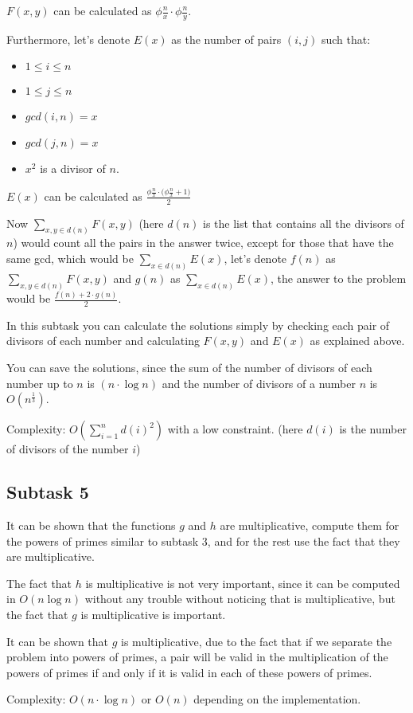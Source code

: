 \(F (x, y)\) can be calculated as
\(\phi {\frac {n} {x}} \cdot \phi {\frac {n} {y}}\).

Furthermore, let's denote \(E (x)\) as the number of pairs \((i, j)\)
such that:

\begin{itemize}
\tightlist
\item
  \(1 \leq i \leq n\)
\item
  \(1 \leq j \leq n\)
\item
  \(gcd (i, n) = x\)
\item
  \(gcd (j, n) = x\)
\item
  \(x ^ 2\) is a divisor of \(n\).
\end{itemize}

\(E (x)\) can be calculated as
\(\frac {\phi {\frac {n} {x}} \cdot (\phi {\frac {n} {x} + 1)}} {2}\)

Now \(\sum_{x, y \in d (n)} F (x, y)\) (here \(d (n)\) is the list that
contains all the divisors of \(n\)) would count all the pairs in the
answer twice, except for those that have the same gcd, which would be
\(\sum_{x \in d (n)} E (x)\), let's denote \(f (n)\) as
\(\sum_{x, y \in d (n)} F (x, y)\) and \(g (n)\) as
\(\sum_ {x \in d (n)} E (x)\), the answer to the problem would be
\(\frac {f (n) + 2 \cdot g (n)} {2}\).

In this subtask you can calculate the solutions simply by checking each
pair of divisors of each number and calculating \(F (x, y)\) and
\(E (x)\) as explained above.

You can save the solutions, since the sum of the number of divisors of
each number up to \(n\) is \((n \cdot \log n)\) and the number of
divisors of a number \(n\) is \(O (n ^ {\frac {1} {3}})\).

Complexity: \(O (\sum_{i = 1}^{n} d(i) ^ 2)\) with a low constraint.
(here \(d (i)\) is the number of divisors of the number \(i\))

\hypertarget{subtask-5}{%
\subsection{Subtask 5}\label{subtask-5}}

It can be shown that the functions \(g\) and \(h\) are multiplicative,
compute them for the powers of primes similar to subtask 3, and for the
rest use the fact that they are multiplicative.

The fact that \(h\) is multiplicative is not very important, since it
can be computed in \(O (n \log {n})\) without any trouble without
noticing that is multiplicative, but the fact that \(g\) is
multiplicative is important.

It can be shown that \(g\) is multiplicative, due to the fact that if we
separate the problem into powers of primes, a pair will be valid in the
multiplication of the powers of primes if and only if it is valid in
each of these powers of primes.

Complexity: \(O (n \cdot \log {n})\) or \(O (n)\) depending on the
implementation.
